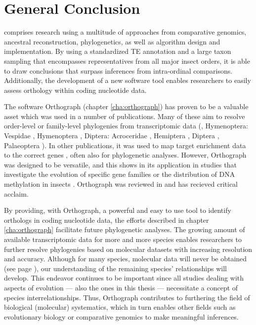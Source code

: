 \chapter{General Conclusion}
\label{conclusion}

 comprises research using a multitude of
approaches from comparative genomics, ancestral reconstruction,
phylogenetics, as well as algorithm design and implementation. By using
a standardized TE annotation and a large taxon sampling that encompasses
representatives from all major insect orders, it is able to draw
conclusions that surpass inferences from intra-ordinal comparisons.
Additionally, the development of a new software tool enables researchers
to easily assess orthology within coding nucleotide data.

The software Orthograph (chapter \ref{cha:orthograph}) has proven to be
a valuable asset which was used in a number of publications. Many of
these aim to resolve order-level or family-level phylogenies from
transcriptomic data (\eg, Hymenoptera: Vespidae \citep{Bank2017},
Hymenoptera \citep{Peters2017}, Diptera: Acroceridae
\citep{Gillung2018}, Hemiptera \citep{Johnson2018}, Diptera
\citep{Kutty2018}, Palaeoptera \citep{Simon2018}). In other
publications, it was used to map target enrichment data to the correct
genes \citep{Mayer2016, Sann2018, Shin2018}, often also for phylogenetic
analyses. However, Orthograph was designed to be versatile, and this
shows in its application in studies that investigate the evolution of
specific gene families \citep{Pauli2016, Dowling2017} or the
distribution of DNA methylation in insects \citep{Provataris2018}.
Orthograph was reviewed in \citet{Nichio2017} and has recieved critical
acclaim.

By providing, with Orthograph, a powerful and easy to use tool to
identify orthologs in coding nucleotide data, the efforts described in
chapter \ref{cha:orthograph} facilitate future phylogenetic analyses.
The growing amount of available transcriptomic data for more and more
species enables researchers to further resolve phylogenies based on
molecular datasets with increasing resolution and accuracy. Although for
many species, molecular data will never be obtained (see page
\pageref{mass-extinction}), our understanding of the remaining species'
relationships will develop. This endeavor continues to be important
since all studies dealing with aspects of evolution --- also the ones in
this thesis --- necessitate a concept of species interrelationships.
Thus, Orthograph contributes to furthering the field of biological
(molecular) systematics, which in turn enables other fields such as
evolutionary biology or comparative genomics to make meaningful
inferences.

